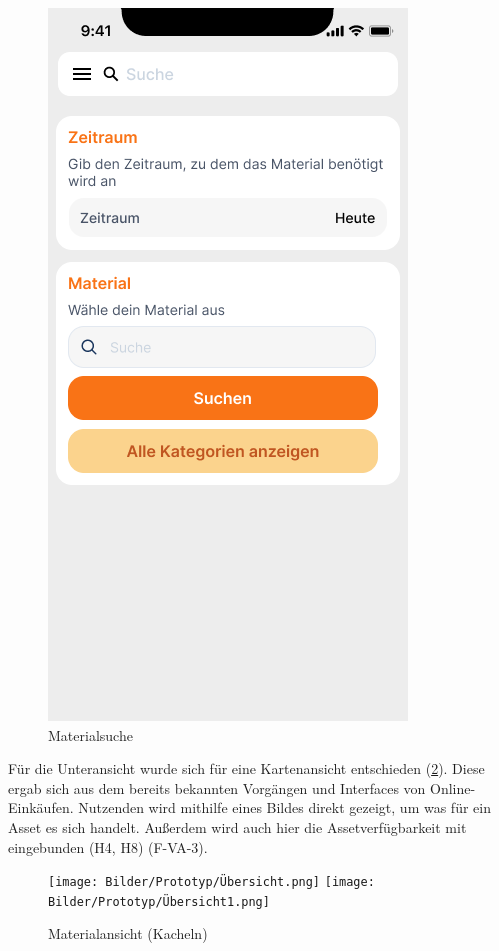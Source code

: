 \begin{figure}[h]
    \includegraphics[scale=0.3]{Bilder/Prototyp/Neu/Suche V2.png}
    \caption[Materialsuche]{Materialsuche}
    \label{fig:p1}
\end{figure}

Für die Unteransicht wurde sich für eine Kartenansicht entschieden
(\ref{fig:ubersicht}). Diese ergab sich aus dem bereits bekannten Vorgängen und
Interfaces von Online-Einkäufen. Nutzenden wird mithilfe eines Bildes direkt
gezeigt, um was für ein Asset es sich handelt. Außerdem wird auch hier die
Assetverfügbarkeit mit eingebunden (H4, H8) (F-VA-3).

\begin{figure}[h]
    \centering
    \texttt{[image: Bilder/Prototyp/Übersicht.png]}\hspace{2em}
    \texttt{[image: Bilder/Prototyp/Übersicht1.png]}
    \caption[Materialansicht (Kacheln)]{Materialansicht (Kacheln)}
    \label{fig:ubersicht}
\end{figure}

